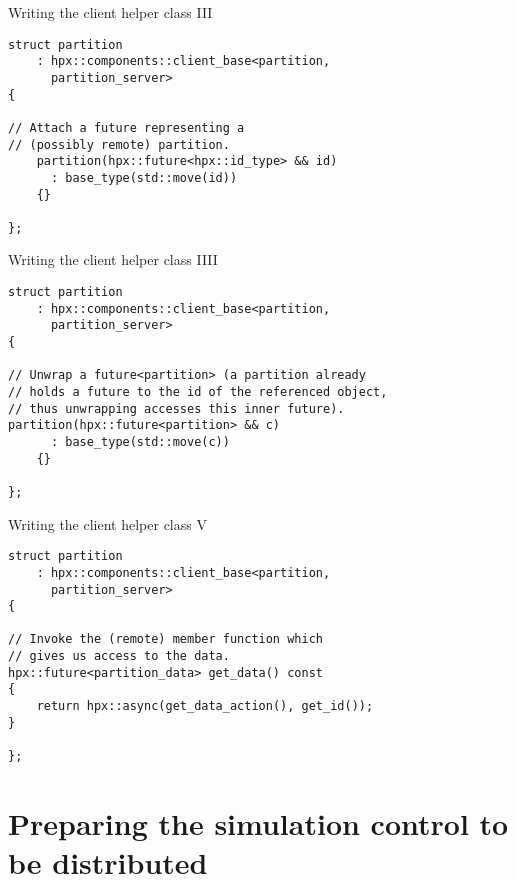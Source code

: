 \documentclass[\classoption]{beamer}
\begin{document}
\begin{frame}[fragile]{Writing the client helper class III}

\begin{lstlisting}
struct partition 
	: hpx::components::client_base<partition, 
	  partition_server>
{

// Attach a future representing a 
// (possibly remote) partition.
    partition(hpx::future<hpx::id_type> && id)
      : base_type(std::move(id))
    {}
    
};
\end{lstlisting}

\end{frame}

\begin{frame}[fragile]{Writing the client helper class IIII}

\begin{lstlisting}
struct partition 
	: hpx::components::client_base<partition, 
	  partition_server>
{

// Unwrap a future<partition> (a partition already 
// holds a future to the id of the referenced object, 
// thus unwrapping accesses this inner future).
partition(hpx::future<partition> && c)
      : base_type(std::move(c))
    {}

};
\end{lstlisting}

\end{frame}

\begin{frame}[fragile]{Writing the client helper class V}

\begin{lstlisting}
struct partition 
	: hpx::components::client_base<partition, 
	  partition_server>
{

// Invoke the (remote) member function which 
// gives us access to the data.
hpx::future<partition_data> get_data() const
{
    return hpx::async(get_data_action(), get_id());
}

};
\end{lstlisting}

\end{frame}

\section{Preparing the simulation control to be distributed}
\end{document}
